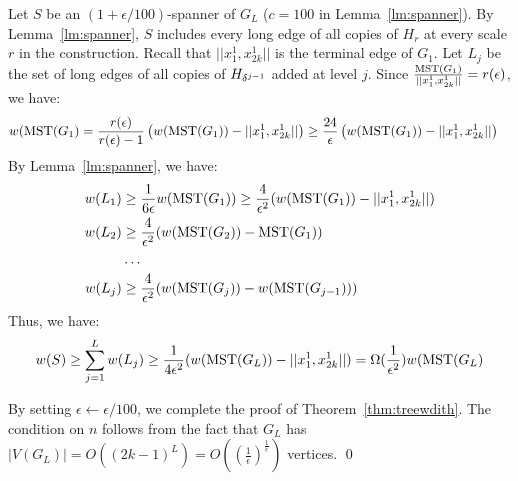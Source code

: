 Let $S$ be an $(1+\epsilon/100)$-spanner of $G_L$ ($c = 100$ in Lemma~\ref{lm:spanner}). By Lemma~\ref{lm:spanner}, $S$ includes every long edge of all copies of $H_r$ at every scale $r$ in the construction. Recall that $||x^1_1,x^{1}_{2k}||$ is the terminal edge of $G_1$. Let $L_j$ be the set of long edges of all copies of $H_{\delta^{j-1}}$ added at level $j$. Since $\frac{\mathrm{MST}(G_1)}{||x^1_1,x^{1}_{2k}||} = r(\epsilon)$,  we have:
\begin{equation}
\begin{split}
w(\mathrm{MST}(G_1) &= \frac{r(\epsilon)}{r(\epsilon)-1}\left(w(\mathrm{MST}(G_1)) - ||x^1_1,x^1_{2k}||\right)\geq \frac{24}{\epsilon}\left(w(\mathrm{MST}(G_1)) - ||x^1_1,x^1_{2k}||\right)
\end{split}
\end{equation}
By Lemma~\ref{lm:spanner}, we have:
\begin{equation}
\begin{split}
w(L_1) &\geq \frac{1}{6\epsilon}w(\mathrm{MST}(G_1)) \geq \frac{4}{\epsilon^2}(w(\mathrm{MST}(G_1)) - ||x^1_1,x^1_{2k}||)\\
w(L_2) &\geq   \frac{4}{\epsilon^2}(w(\mathrm{MST}(G_2)) - \mathrm{MST}(G_1))\\
&\ldots \\
w(L_j) &\geq \frac{4}{\epsilon^2}(w(\mathrm{MST}(G_{j})) - w(\mathrm{MST}(G_{j-1})))
\end{split}
\end{equation}
Thus, we have:
\begin{equation*}
w(S) \geq \sum_{j=1}^L w(L_j) \geq \frac{1}{4\epsilon^2}(w(\mathrm{MST}(G_L)) - ||x^1_1,x^1_{2k}||) = \Omega(\frac{1}{\epsilon^2})w(\mathrm{MST}(G_L)
\end{equation*}

By setting $\epsilon \leftarrow \epsilon/100$, we complete the proof of Theorem~\ref{thm:treewdith}. The condition on $n$ follows from the fact that  $G_L$ has $|V(G_L)| = O( (2k-1)^{L}) = O((\frac{1}{\epsilon})^{\frac{1}{\epsilon}})$ vertices. \qed

